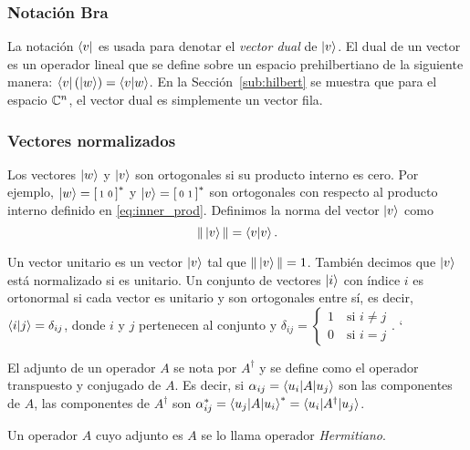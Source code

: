 \subsubsection{Notación Bra}
La notación $\bra{v}$ es usada para denotar el \emph{vector dual} de $\ket{v}$. El dual de un vector es un operador lineal que se define sobre un espacio prehilbertiano de la siguiente manera: $\bra{v}(\ket{w}) = \braket{v|w}$. En la Sección~\ref{sub:hilbert} se muestra que para el espacio $\mathbb{C}^n$, el vector dual es simplemente un vector fila.

\subsubsection{Vectores normalizados}


Los vectores $\ket{w}$ y $\ket{v}$ son ortogonales si su producto interno es cero. Por ejemplo, \(\ket{w}=\begin{bsmallmatrix}
    1 & 0
\end{bsmallmatrix}^*\) y \(\ket{v}=\begin{bsmallmatrix}
    0 & 1
\end{bsmallmatrix}^*\) son ortogonales con respecto al producto interno definido en \ref{eq:inner_prod}. Definimos la norma del vector $\ket{v}$ como
\begin{equation}
    \Vert \ket{v} \Vert = \braket{v|v}.
\end{equation}


Un vector unitario es un vector $\ket{v}$ tal que $\Vert \ket{v} \Vert = 1$. También decimos que $\ket{v}$ está normalizado si es unitario. Un conjunto de vectores $\ket{i}$ con índice $i$ es ortonormal si cada vector es unitario y son ortogonales entre sí, es decir, $\braket{i|j} = \delta_{ij}$, donde $i$ y $j$ pertenecen al conjunto y \(\delta_{ij} = \begin{cases}
1 \quad\text{si } i\neq j\\
0 \quad\text{si } i=j
\end{cases}\).
`
\begin{definicion}[Adjunto]
El adjunto de un operador $A$ se nota por $A^\dagger$ y se define como el operador transpuesto y conjugado de $A$. Es decir, si $\alpha_{ij}=\braket{u_i|A|u_j}$ son las componentes de $A$, las componentes de $A^\dagger$ son $\alpha^*_{ij} = \braket{u_j|A|u_i}^* = \braket{u_i|A^\dagger|u_j}$.
\end{definicion}

\begin{definicion}
    Un operador $A$ cuyo adjunto es $A$ se lo llama operador \emph{Hermitiano}.
\end{definicion}

